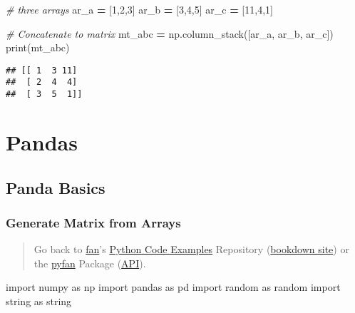 \documentclass[
]{book}
\newenvironment{Shaded}{\begin{snugshade}}{\end{snugshade}}
\newcommand{\BuiltInTok}[1]{#1}
\newcommand{\CommentTok}[1]{\textcolor[rgb]{0.56,0.35,0.01}{\textit{#1}}}
\newcommand{\DecValTok}[1]{\textcolor[rgb]{0.00,0.00,0.81}{#1}}
\newcommand{\ImportTok}[1]{#1}
\newcommand{\NormalTok}[1]{#1}
\newcommand{\OperatorTok}[1]{\textcolor[rgb]{0.81,0.36,0.00}{\textbf{#1}}}
\begin{document}
\begin{Shaded}
\begin{Highlighting}[]
\CommentTok{\# three arrays}
\NormalTok{ar\_a }\OperatorTok{=}\NormalTok{ [}\DecValTok{1}\NormalTok{,}\DecValTok{2}\NormalTok{,}\DecValTok{3}\NormalTok{]}
\NormalTok{ar\_b }\OperatorTok{=}\NormalTok{ [}\DecValTok{3}\NormalTok{,}\DecValTok{4}\NormalTok{,}\DecValTok{5}\NormalTok{]}
\NormalTok{ar\_c }\OperatorTok{=}\NormalTok{ [}\DecValTok{11}\NormalTok{,}\DecValTok{4}\NormalTok{,}\DecValTok{1}\NormalTok{]}

\CommentTok{\# Concatenate to matrix}
\NormalTok{mt\_abc }\OperatorTok{=}\NormalTok{ np.column\_stack([ar\_a, ar\_b, ar\_c])}
\BuiltInTok{print}\NormalTok{(mt\_abc)}
\end{Highlighting}
\end{Shaded}

\begin{verbatim}
## [[ 1  3 11]
##  [ 2  4  4]
##  [ 3  5  1]]
\end{verbatim}

\hypertarget{pandas}{%
\chapter{Pandas}\label{pandas}}

\hypertarget{panda-basics}{%
\section{Panda Basics}\label{panda-basics}}

\hypertarget{generate-matrix-from-arrays-1}{%
\subsection{Generate Matrix from Arrays}\label{generate-matrix-from-arrays-1}}

\begin{quote}
Go back to \href{http://fanwangecon.github.io/}{fan}'s \href{https://fanwangecon.github.io/Py4Econ/}{Python Code Examples} Repository (\href{https://fanwangecon.github.io/Py4Econ/bookdown}{bookdown site}) or the \href{https://pyfan.readthedocs.io/en/latest/}{pyfan} Package (\href{https://pyfan.readthedocs.io/en/latest/reference.html}{API}).
\end{quote}

\begin{Shaded}
\begin{Highlighting}[]
\ImportTok{import}\NormalTok{ numpy }\ImportTok{as}\NormalTok{ np}
\ImportTok{import}\NormalTok{ pandas }\ImportTok{as}\NormalTok{ pd}
\ImportTok{import}\NormalTok{ random }\ImportTok{as}\NormalTok{ random}
\ImportTok{import}\NormalTok{ string }\ImportTok{as}\NormalTok{ string}
\end{Highlighting}
\end{Shaded}
\end{document}
